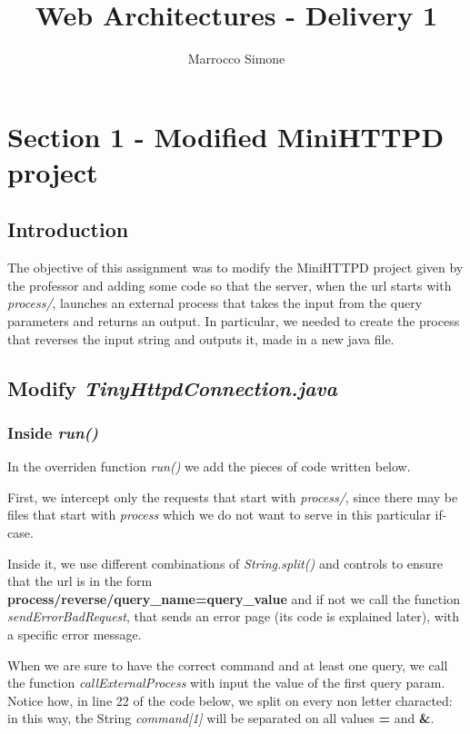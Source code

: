 \documentclass[12pt, a4paper]{article}
\begin{document}
  \title{Web Architectures - Delivery 1}
  \author{Marrocco Simone}
  \maketitle
  \tableofcontents
  \pagebreak

  \section{Section 1 - Modified MiniHTTPD project}
  \subsection{Introduction}
  The objective of this assignment was to modify the MiniHTTPD project given by the professor and adding some code so that the server, when the url starts with \textit{process/}, launches an external process that takes the input from the query parameters and returns an output. In particular, we needed to create the process that reverses the input string and outputs it, made in a new java file.

  \subsection{Modify \textit{TinyHttpdConnection.java}}
  \subsubsection{Inside \textit{run()}}
  In the overriden function \textit{run()} we add the pieces of code written below.

  First, we intercept only the requests that start with \textit{process/}, since there may be files that start with \textit{process} which we do not want to serve in this particular if-case. 

  Inside it, we use different combinations of \textit{String.split()} and controls to ensure that the url is in the form \\\textbf{process/reverse/query\_name=query\_value} and if not we call the function \textit{sendErrorBadRequest}, that sends an error page (its code is explained later), with a specific error message.

  When we are sure to have the correct command and at least one query, we call the function \textit{callExternalProcess} with input the value of the first query param. Notice how, in line 22 of the code below, we split on every non letter characted: in this way, the String \textit{command[1]} will be separated on all values \textbf{=} and \textbf{\&}.
\end{document}
